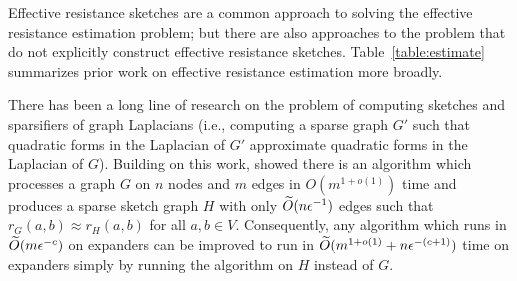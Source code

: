 Effective resistance sketches are a common approach to solving the effective resistance estimation problem; but there are also approaches to the problem that do not explicitly construct effective resistance sketches. Table~\ref{table:estimate} summarizes prior work on effective resistance estimation more broadly.

There has been a long line of research on the problem of computing sketches and sparsifiers of graph Laplacians \cite{andoni2015sketching, spielman2009graph, JS2018, chu2018graph} (i.e., computing a sparse graph $G'$ such that quadratic forms in the Laplacian of $G'$ approximate quadratic forms in the Laplacian of $G$). Building on this work, \cite{chu2018graph} showed there is an algorithm which processes a graph $G$ on $n$ nodes and $m$ edges in $O(m^{1 + o(1)})$ time and produces a sparse sketch graph $H$ with only $\widetilde{O}( {n\epsilon^{-1}} )$ edges such that $r_G(a,b)\approx r_H(a, b)$ for all $a, b \in V$. Consequently, any algorithm which runs in $\widetilde{O}( {m\epsilon^{-c}} )$ on expanders can be improved to run in $\widetilde{O}( {m^{1+o(1)} + n\epsilon^{-(c+1)}} )$ time on expanders simply by running the algorithm on $H$ instead of $G$.

